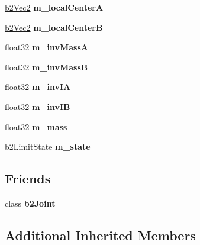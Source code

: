 \begin{DoxyCompactItemize}
\mbox{\label{classb2_rope_joint_a15ff1472deb6405c9886a40ee99efcef}} 
\hyperlink{structb2_vec2}{b2\+Vec2} {\bfseries m\+\_\+local\+CenterA}
\item 
\mbox{\label{classb2_rope_joint_a2b3b1ac9ae9e3e68b2550809ec178877}} 
\hyperlink{structb2_vec2}{b2\+Vec2} {\bfseries m\+\_\+local\+CenterB}
\item 
\mbox{\label{classb2_rope_joint_a690e4fe5ab7a279accac3b137d5f5c76}} 
float32 {\bfseries m\+\_\+inv\+MassA}
\item 
\mbox{\label{classb2_rope_joint_a9709179725abed80d4957df82bc24512}} 
float32 {\bfseries m\+\_\+inv\+MassB}
\item 
\mbox{\label{classb2_rope_joint_a1917a65b89668c433d06071970a6875a}} 
float32 {\bfseries m\+\_\+inv\+IA}
\item 
\mbox{\label{classb2_rope_joint_a1ce440194cec6e275193d7224ce1e448}} 
float32 {\bfseries m\+\_\+inv\+IB}
\item 
\mbox{\label{classb2_rope_joint_a1f355a976b177b75a8fd47190194d5c1}} 
float32 {\bfseries m\+\_\+mass}
\item 
\mbox{\label{classb2_rope_joint_ac73c9451360c80c8a98376b922f4bed4}} 
b2\+Limit\+State {\bfseries m\+\_\+state}
\end{DoxyCompactItemize}
\subsection*{Friends}
\begin{DoxyCompactItemize}
\item 
\mbox{\label{classb2_rope_joint_a54ade8ed3d794298108d7f4c4e4793fa}} 
class {\bfseries b2\+Joint}
\end{DoxyCompactItemize}
\subsection*{Additional Inherited Members}


